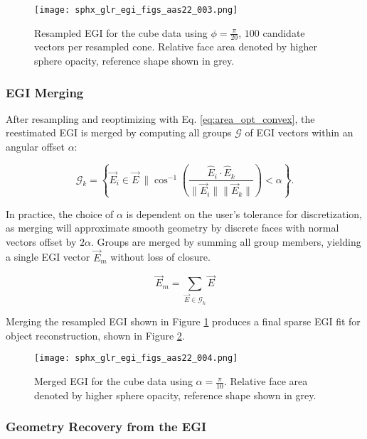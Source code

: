 \begin{figure}[!htb]
  \centering
  \texttt{[image: sphx\_glr\_egi\_figs\_aas22\_003.png]}
  \caption{Resampled EGI for the cube data using $\phi = \frac{\pi}{20}$, $100$ candidate vectors per resampled cone. Relative face area denoted by higher sphere opacity, reference shape shown in grey.}
  \label{fig:resampled_egi}
\end{figure}

\subsubsection{EGI Merging}

After resampling and reoptimizing with Eq. \ref{eq:area_opt_convex}, the reestimated EGI is merged by computing all groups $\mathcal{G}$ of EGI vectors within an angular offset $\alpha$:

\begin{equation}
  \mathcal{G}_k = \left\{ \vec{E}_i \in \vec{E} \:\| \cos^{-1}\left( \frac{\hat{E}_i \cdot \hat{E}_k}{\|\vec{E}_i \| \| \vec{E}_k \|}\right) < \alpha \right\}.
\end{equation}

In practice, the choice of $\alpha$ is dependent on the user's tolerance for discretization, as merging will approximate smooth geometry by discrete faces with normal vectors offset by $2\alpha$. Groups are merged by summing all group members, yielding a single EGI vector $\vec{E}_m$ without loss of closure. 

\begin{equation} \label{eq:fixing_egi}
  \vec{E}_m = \sum_{\vec{E} \in \mathcal{G}_k}{\vec{E}}
\end{equation}

Merging the resampled EGI shown in Figure \ref{fig:resampled_egi} produces a final sparse EGI fit for object reconstruction, shown in Figure \ref{fig:merged_egi}. 

\begin{figure}[!htb]
  \centering
  \texttt{[image: sphx\_glr\_egi\_figs\_aas22\_004.png]}
  \caption{Merged EGI for the cube data using $\alpha = \frac{\pi}{10}$. Relative face area denoted by higher sphere opacity, reference shape shown in grey.}
  \label{fig:merged_egi}
\end{figure}

\subsubsection{Geometry Recovery from the EGI}

